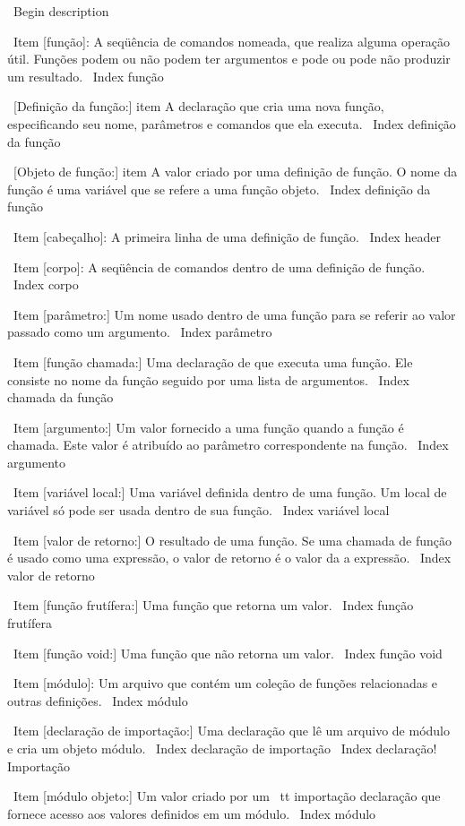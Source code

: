 \documentclass[10pt]{book}
\begin{document}
{\ Begin {description}

\ Item [função]: A seqüência de comandos nomeada, que realiza alguma
operação útil. Funções podem ou não podem ter argumentos e pode ou
pode não produzir um resultado.
\ Index {função}

\ [Definição da função:] item A declaração que cria uma nova função,
especificando seu nome, parâmetros e comandos que ela executa.
\ Index {definição da função}

\ [Objeto de função:] item A valor criado por uma definição de função.
O nome da função é uma variável que se refere a uma função
objeto.
\ Index {definição da função}

\ Item [cabeçalho]: A primeira linha de uma definição de função.
\ Index {header}

\ Item [corpo]: A seqüência de comandos dentro de uma definição de função.
\ Index {corpo}

\ Item [parâmetro:] Um nome usado dentro de uma função para se referir ao valor
passado como um argumento.
\ Index {parâmetro}

\ Item [função chamada:] Uma declaração de que executa uma função. Ele
consiste no nome da função seguido por uma lista de argumentos.
\ Index {chamada da função}

\ Item [argumento:] Um valor fornecido a uma função quando a função é chamada.
Este valor é atribuído ao parâmetro correspondente na função.
\ Index {argumento}

\ Item [variável local:] Uma variável definida dentro de uma função. Um local de
variável só pode ser usada dentro de sua função.
\ Index {variável local}

\ Item [valor de retorno:] O resultado de uma função. Se uma chamada de função
é usado como uma expressão, o valor de retorno é o valor da
a expressão.
\ Index {valor de retorno}

\ Item [função frutífera:] Uma função que retorna um valor.
\ Index {função frutífera}

\ Item [função void:] Uma função que não retorna um valor.
\ Index {função void}

\ Item [módulo]: Um arquivo que contém um
coleção de funções relacionadas e outras definições.
\ Index {módulo}

\ Item [declaração de importação:] Uma declaração que lê um arquivo de módulo e cria
um objeto módulo.
\ Index {declaração de importação}
\ Index {declaração! Importação}

\ Item [módulo objeto:] Um valor criado por um {\ tt importação} declaração
que fornece acesso aos valores definidos em um módulo.
\ Index {módulo}

}
\end{document}
